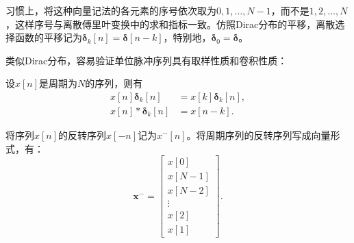 习惯上，将这种向量记法的各元素的序号依次取为$0,1,\dots,N-1$，而不是$1,2,\dots,N$，这样序号与离散傅里叶变换中的求和指标一致。仿照Dirac分布的平移，离散选择函数的平移记为$\boldsymbol{\delta}_k[n]=\boldsymbol{\delta}[n-k]$，特别地，$\boldsymbol{\delta}_0=\boldsymbol{\delta}$。

类似Dirac分布，容易验证单位脉冲序列具有取样性质和卷积性质：
\begin{proposition}
    设$x[n]$是周期为$N$的序列，则有
    \begin{align}
        x[n]\boldsymbol{\delta}_k[n]&=x[k]\boldsymbol{\delta}_k[n], \\
        x[n]*\boldsymbol{\delta}_k[n]&=x[n-k].
    \end{align}
\end{proposition}

\begin{definition}[序列的反转]
    将序列$x[n]$的反转序列$x[-n]$记为$x^-[n]$。将周期序列的反转序列写成向量形式，有：
    \begin{equation}
        \mathbf{x}^-=\begin{bmatrix}
            x[0]   \\
            x[N-1] \\
            x[N-2] \\
            \vdots \\
            x[2]   \\
            x[1]
        \end{bmatrix}.
    \end{equation}
\end{definition}

